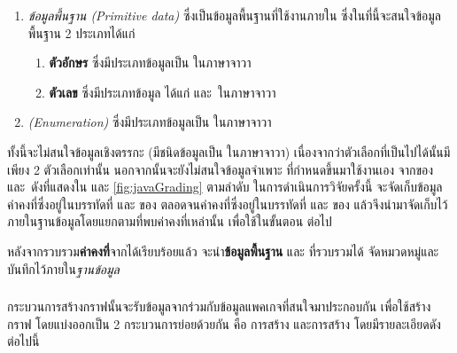 \begin{enumerate}
    \item {\it ข้อมูลพื้นฐาน (Primitive data)} ซึ่งเป็นข้อมูลพื้นฐานที่ใช้งานภายใน{\class} ซึ่งในที่นี้จะสนใจข้อมูลพื้นฐาน 2 ประเภทได้แก่
        \begin{enumerate}
            \item {\bf ตัวอักษร} ซึ่งมีประเภทข้อมูลเป็น  ในภาษาจาวา
            \item {\bf ตัวเลข} ซึ่งมีประเภทข้อมูล ได้แก่  และ\, ในภาษาจาวา
        \end{enumerate}
    \item {\it {\enum} (Enumeration)} ซึ่งมีประเภทข้อมูลเป็น  ในภาษาจาวา
\end{enumerate}

ทั้งนี้จะไม่สนใจข้อมูลเชิงตรรกะ (มีชนิดข้อมูลเป็น  ในภาษาจาวา) เนื่องจากว่าตัวเลือกที่เป็นไปได้นั้นมีเพียง 2 ตัวเลือกเท่านั้น
นอกจากนั้นจะยังไม่สนใจข้อมูลจำเพาะ ที่กำหนดขึ้นมาใช้งานเอง 
จาก{\sourcecode}ของ{\class}  และ\, ดังที่แสดงใน 
 และ \ref{fig:javaGrading} ตามลำดับ ในการดำเนินการวิจัยครั้งนี้ 
จะจัดเก็บข้อมูลค่าคงที่ซึ่งอยู่ในบรรทัดที่  และ  ของ{\class} 
ตลอดจนค่าคงที่ซึ่งอยู่ในบรรทัดที่  และ  ของ{\class}  
แล้วจึงนำมาจัดเก็บไว้ภายในฐานข้อมูลโดยแยกตาม{\class}ที่พบค่าคงที่เหล่านั้น เพื่อใช้ในขั้นตอน {\bf \testcaseGeneration} ต่อไป

หลังจากรวบรวม{\bf ค่าคงที่}จาก{\sourcecode}ได้เรียบร้อยแล้ว จะนำ{\bf ข้อมูลพื้นฐาน} และ{\bf {\enum}} ที่รวบรวมได้
จัดหมวดหมู่และบันทึกไว้ภายใน{\it ฐานข้อมูล}

\subsubsection{\graphCreation}
\label{sec:sub:sub:graphCreation}

กระบวนการสร้างกราฟนั้นจะรับข้อมูล{\sourcecode}จาก{\Repository}ร่วมกับข้อมูลแพคเกจที่{\tester}สนใจมาประกอบกัน 
เพื่อใช้สร้างกราฟ โดยแบ่งออกเป็น 2 กระบวนการย่อยด้วยกัน คือ การสร้าง{\scg} และการสร้าง{\cfg} โดยมีรายละเอียดดังต่อไปนี้

